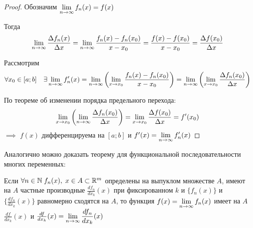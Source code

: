 \begin{proof}
    Обозначим $\displaystyle\lim_{n \to \infty} f_n(x) = f(x)$

    Тогда
    \[
        \displaystyle\lim_{n \to \infty} \frac{\Delta f_n(x)}{\Delta x}
        = \displaystyle\lim_{n \to \infty} \frac{f_n(x) - f_n(x_0)}{x - x_0}
        = \frac{f(x) - f(x_0)}{x - x_0} = \frac{\Delta f(x_0)}{\Delta x}
    \]

    Рассмотрим 
    \[
        \forall x_0 \in [a; b] \quad \exists \displaystyle\lim_{n \to \infty} f_n'(x)
        = \displaystyle\lim_{n \to \infty} \left( \displaystyle\lim_{x \to x_0} \frac{f_n(x) - f_n(x_0)}{x - x_0} \right)
        = \displaystyle\lim_{n \to \infty} \left( \displaystyle\lim_{x \to x_0} \frac{\Delta f_n(x_0)}{\Delta x} \right)
    \]

    По теореме об изменении порядка предельного перехода:
    \[
        \displaystyle\lim_{x \to x_0} \left( \displaystyle\lim_{n \to \infty} \frac{\Delta f_n(x_0)}{\Delta x} \right)
        = \displaystyle\lim_{x \to x_0} \frac{\Delta f(x_0)}{\Delta x} = f'(x_0)
    \]
    $\implies$ $f(x)$ дифференцируема на $[a; b]$ и $f'(x) = \displaystyle\lim_{n \to \infty} f_n'(x)$
\end{proof}

\begin{remark}
    Аналогично можно доказать теорему для функциональной последовательности
    многих переменных:

    Если $\forall n \in \mathbb{N} \; f_n(x), \; x \in A \subset \mathbb{R}^m$ определены на
    выпуклом множестве $A$, имеют на $A$ частные производные 
    $\frac{d f_n}{d x_k} (x)$ при фиксированном $k$ и
    $\{ f_n(x) \}$ и $\{ \frac{d f_n}{d x_k} (x) \}$ равномерно сходятся на
    $A$, то функция $f(x) = \displaystyle\lim_{n \to \infty} f_n(x)$ имеет на $A \;$ 
    $\frac{df}{dx_k} (x)$ 
    и $\frac{df}{dx_k} (x) = \displaystyle\lim_{n \to \infty} \frac{df_n}{dx_k} (x)$ 
\end{remark}

